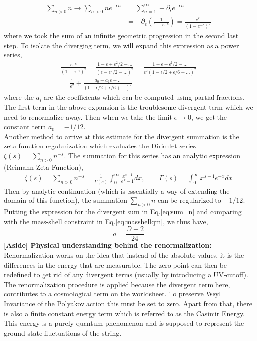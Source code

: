 \documentclass{article}
\providecommand{\brak}[1]{\ensuremath{\left(#1\right)}} %
\begin{document}
\begin{align}
	\sum_{n>0}n \rightarrow \sum_{n>0}ne^{-\epsilon n}&=\sum_{n=1}^\infty -\partial_\epsilon e^{-\epsilon n}\\
    &= -\partial_\epsilon\brak{\frac{1}{1-e^{-\epsilon}}} = \frac{e^\epsilon}{(1-e^{-\epsilon})^2}
\end{align}
where we took the sum of an infinite geometric progression in the second last step. To isolate the diverging term, we will expand this expression as a power series,
\begin{align}
    \frac{e^{-\epsilon}}{(1-e^{-\epsilon})^2} = \frac{1-\epsilon+\epsilon^2/2-...}{(\epsilon-\epsilon^2/2-...)^2}= \frac{1-\epsilon+\epsilon^2/2-...}{\epsilon^2(1-\epsilon/2+\epsilon/6+...)^2}\\
    =\frac{1}{\epsilon^2} + \frac{a_0+a_1\epsilon+..}{(1-\epsilon/2+\epsilon/6+...)^2}
\end{align}
where the $a_i$ are the coefficients which can be computed using partial fractions. The first term in the above expansion is the troublesome divergent term which we need to renormalize away. Then when we take the limit $\epsilon\rightarrow0$, we get the constant term $a_0=-1/12$.\\

Another method to arrive at this estimate for the divergent summation is the zeta function regularization which evaluates the Dirichlet series $\zeta(s)=\sum_{n>0}n^{-s}$. The summation for this series has an analytic expression (Reimann Zeta Function),
\begin{align}
    \zeta(s) = \sum_{n>0}n^{-s} = \frac{1}{\Gamma(s)}\int_0^\infty \frac{x^{s-1}}{e^x-1}dx,\quad\quad \Gamma(s) = \int_0^\infty  x^{s-1}e^{-x}dx
\end{align}
Then by analytic continuation (which is essentially a way of extending the domain of this function), the summation $\sum_{n>0}n$ can be regularized to $-1/12$.\\

Putting the expression for the divergent sum in Eq.\eqref{eq:sum_n} and comparing with the mass-shell constraint in Eq.\eqref{eq:masshellqm}, we thus have,
\begin{equation}
    a=\frac{D-2}{24}
\end{equation}
\textbf{[Aside] Physical understanding behind the renormalization: } Renormalization works on the idea that instead of the absolute values, it is the differences in the energy that are measurable. The zero point can then be redefined to get rid of any divergent terms (usually by introducing a UV-cutoff). The renormalization procedure is applied because the divergent term here, contributes to a cosmological term on the worldsheet. To preserve Weyl Invariance of the Polyakov action this must be set to zero.  Apart from that, there is also a finite constant energy term which is referred to as the Casimir Energy. This energy is a purely quantum phenomenon and is supposed to represent the ground state fluctuations of the string.\\
\end{document}
